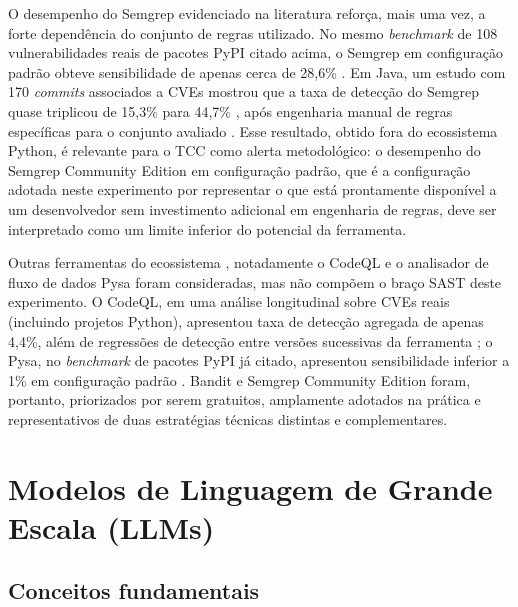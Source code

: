 O desempenho do Semgrep evidenciado na literatura reforça, mais uma vez, a forte dependência do conjunto de regras utilizado. No mesmo \textit{benchmark} de 108 vulnerabilidades reais de pacotes PyPI citado acima, o Semgrep em configuração padrão obteve sensibilidade de apenas cerca de 28,6\% \cite{Marquer2026SAGA}. Em Java, um estudo com 170 \textit{commits} associados a CVEs mostrou que a taxa de detecção do Semgrep quase triplicou de 15,3\% para 44,7\% , após engenharia manual de regras específicas para o conjunto avaliado \cite{Bennett2024Semgrep}. Esse resultado, obtido fora do ecossistema Python, é relevante para o TCC como alerta metodológico: o desempenho do Semgrep Community Edition em configuração padrão, que é a configuração adotada neste experimento por representar o que está prontamente disponível a um desenvolvedor sem investimento adicional em engenharia de regras, deve ser interpretado como um limite inferior do potencial da ferramenta.

Outras ferramentas do ecossistema , notadamente o CodeQL e o analisador de fluxo de dados Pysa  foram consideradas, mas não compõem o braço SAST deste experimento. O CodeQL, em uma análise longitudinal sobre CVEs reais (incluindo projetos Python), apresentou taxa de detecção agregada de apenas 4,4\%, além de regressões de detecção entre versões sucessivas da ferramenta \cite{Noirot2025CodeQLLongitudinal}; o Pysa, no \textit{benchmark} de pacotes PyPI já citado, apresentou sensibilidade inferior a 1\% em configuração padrão \cite{Marquer2026SAGA}. Bandit e Semgrep Community Edition foram, portanto, priorizados por serem gratuitos, amplamente adotados na prática e representativos de duas estratégias técnicas distintas e complementares.


\section{Modelos de Linguagem de Grande Escala (LLMs)}\label{sec:llms}
\subsection{Conceitos fundamentais}\label{subsec:llms-conceitos}
